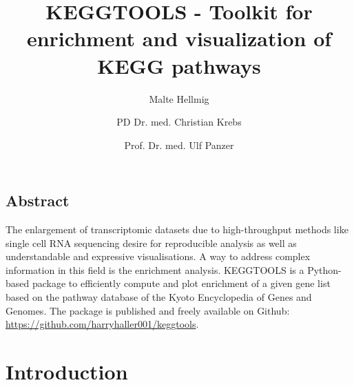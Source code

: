 \documentclass[11pt,a4paper]{article}
\begin{document}
\begin{titlepage}

    \title{KEGGTOOLS - Toolkit for enrichment and visualization of KEGG pathways}

    \author[1]{Malte Hellmig}
    \author[1, 2]{PD Dr. med. Christian Krebs}
    \author[1, 2]{Prof. Dr. med. Ulf Panzer}
    \date{}
    \clearpage\maketitle
    \thispagestyle{empty}


    \section*{Abstract}

    The enlargement of transcriptomic datasets due to high-throughput methods
    like single cell RNA sequencing desire for reproducible analysis as well
    as understandable and expressive visualisations. A way to address complex
    information in this field is the enrichment analysis. KEGGTOOLS is a
    Python-based package to efficiently compute and plot enrichment of a given
    gene list based on the pathway database of the Kyoto Encyclopedia of Genes
    and Genomes. The package is published and freely available on Github:
    \mbox{\url{https://github.com/harryhaller001/keggtools}}.


\end{titlepage}

\newpage
\setcounter{page}{1}

\section{Introduction}

\lipsum[1-2]




\end{document}
